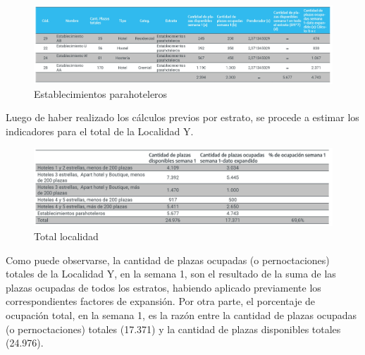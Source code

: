 \documentclass[
]{book}
\begin{document}
\begin{figure}

{\centering \includegraphics[width=0.8\linewidth]{imagenes/establecimientos_parahoteleros} 

}

\caption{Establecimientos parahoteleros}\label{fig:para-hoteleros}
\end{figure}

Luego de haber realizado los cálculos previos por estrato, se procede a estimar los indicadores para el total de la Localidad Y.

\begin{figure}

{\centering \includegraphics[width=0.8\linewidth]{imagenes/figuras_parte123_01} 

}

\caption{Total localidad}\label{fig:total-localodad-y}
\end{figure}

Como puede observarse, la cantidad de plazas ocupadas (o pernoctaciones) totales de la Localidad Y, en la semana 1, son el resultado de la suma de las plazas ocupadas de todos los estratos, habiendo aplicado previamente los correspondientes factores de expansión. Por otra parte, el porcentaje de ocupación total, en la semana 1, es la razón entre la cantidad de plazas ocupadas (o pernoctaciones) totales (17.371) y la cantidad de plazas disponibles totales (24.976).

  
\end{document}
